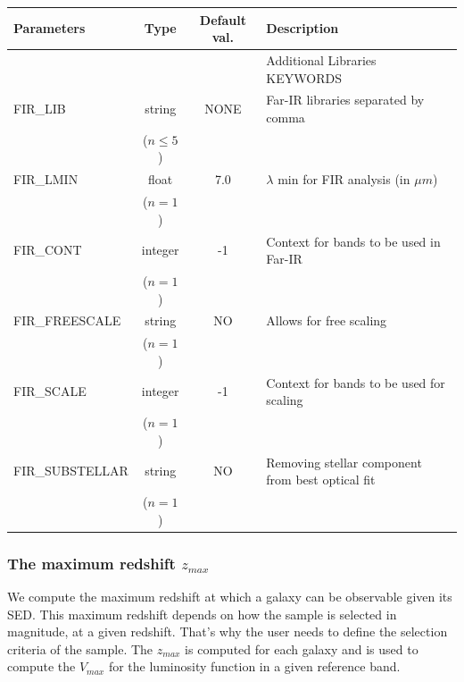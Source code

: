 \documentclass[12pt]{article}
\begin{document}
\begin{tabular}{lccl}
\\[0.5cm]
\textbf{Parameters}     & \textbf{Type}    & \textbf{Default val.} &  \textbf{Description}                                             \\[5pt]
\hline
                             &           &          &   Additional Libraries KEYWORDS    \\
%
\hline
%
FIR\_LIB          & string      &  NONE   &  Far-IR libraries separated by comma   \\
                        & ($n\le 5$)&               &              \\
%
FIR\_LMIN      &  float         &     7.0    &  $\lambda$ min for FIR analysis (in $\mu m$) \\
                        & ($n=1$)   &               &             \\
% 
FIR\_CONT     &  integer    &     -1      &  Context for bands to be used in Far-IR     \\
                        & ($n=1$)   &               &             \\
%
FIR\_FREESCALE  & string &  NO       &  Allows for free scaling  \\
                        & ($n= 1$)&               &     \\
%
FIR\_SCALE    &   integer   &   -1        &   Context for bands to be used for scaling  \\
                        & ($n= 1$)  &               &     \\
%
FIR\_SUBSTELLAR  & string &   NO    &  Removing stellar component from best optical fit  \\
                        & ($n =1$)&               &     \\
\hline
\end{tabular}
%  



\subsubsection{The maximum redshift $z_{max}$}

We compute the maximum redshift at which a galaxy can be observable given its SED. This maximum redshift depends on how the sample is selected in magnitude, at a given redshift. That's why the user needs to define the selection criteria of the sample. The $z_{max}$ is computed for each galaxy and is used to compute the $V_{max}$ for the luminosity function in a given reference band.
\end{document}
